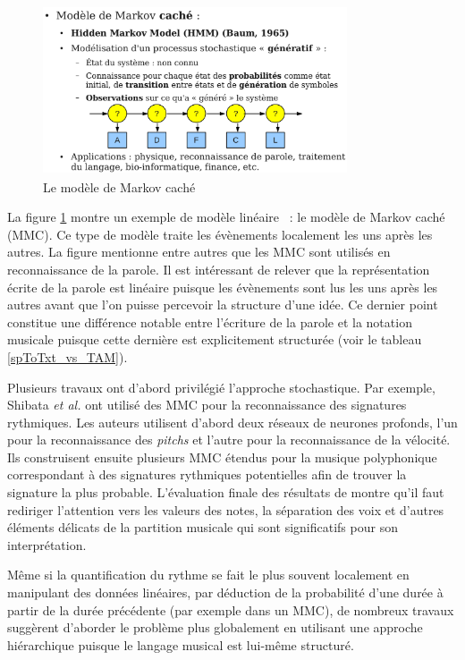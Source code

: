 \begin{figure}[h]
	\centering
	\includegraphics[height=50mm, width=90mm]{
    z_images/2_etat_de_l_art/0_hmm.png}
	\caption[Le modèle de Markov caché]{Le modèle de Markov caché\footnotemark}
    \label{mmc}
\end{figure}

La figure \ref{mmc} montre un exemple de modèle linéaire~ : le modèle de Markov
caché (MMC). Ce type de modèle traite les évènements localement les uns après les
autres. La figure mentionne entre autres que les MMC sont utilisés en
reconnaissance de la parole. Il est intéressant de relever que la
représentation écrite de la parole est linéaire puisque les évènements sont lus
les uns après les autres avant que l’on puisse percevoir la structure d’une
idée. Ce dernier point constitue une différence notable entre l’écriture de la
parole et la notation musicale puisque cette dernière est explicitement
structurée (voir le tableau \ref{spToTxt_vs_TAM}).

Plusieurs travaux ont d’abord privilégié l’approche stochastique. Par exemple,
Shibata \textit{et al.} \cite{shibata} ont utilisé des MMC pour la
reconnaissance des signatures rythmiques. Les auteurs utilisent d’abord deux
réseaux de neurones profonds, l’un pour la reconnaissance des \textit{pitchs}
et l’autre pour la reconnaissance de la vélocité. Ils construisent ensuite
plusieurs MMC étendus pour la musique polyphonique correspondant à des
signatures rythmiques potentielles afin de trouver la signature la plus
probable. L’évaluation finale des résultats de \cite{shibata} montre
qu’il faut  rediriger l’attention vers les
valeurs des notes, la séparation des voix et d’autres éléments délicats de la
partition musicale qui sont significatifs pour son interprétation.

Même si la quantification du rythme se fait le plus souvent localement en
manipulant des données linéaires, par déduction de la probabilité d’une durée à
partir de la durée précédente (par exemple dans un MMC), de nombreux travaux
suggèrent d’aborder le problème plus globalement en utilisant une approche
hiérarchique puisque le langage musical est lui-même structuré.


